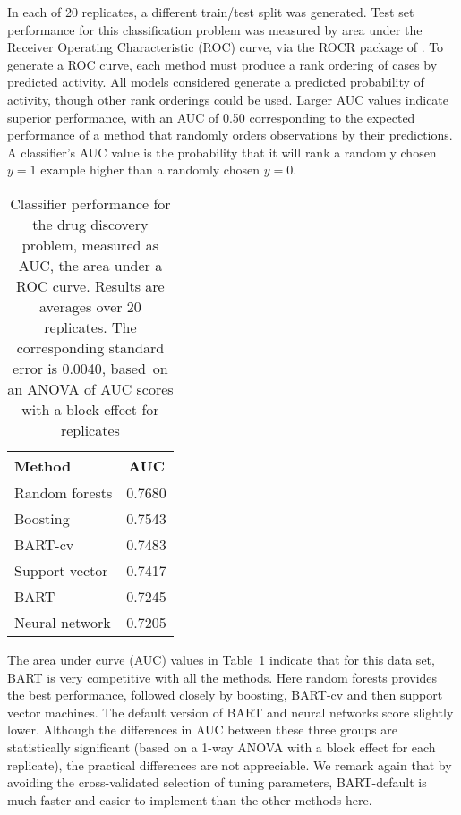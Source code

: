 \documentclass[aoas,nameyear,dvips]{arximspdf}
\newcommand{\citeasnoun}[1]{\citet{#1}}
\begin{document}
In each of 20 replicates, a different train/test split was generated.
Test set performance for this classification problem was measured by area under the
Receiver Operating Characteristic (ROC) curve, via the ROCR package of
\citeasnoun{ROCR}.  To generate a ROC curve, each method must produce a rank
ordering of cases by predicted activity.  All models considered generate a
predicted probability of activity, though other rank orderings could be
used.  Larger AUC values indicate superior performance, with an AUC of 0.50
corresponding to the expected performance of a method that randomly
orders observations by their predictions.  A classifier's AUC value
is the probability that it will rank a randomly chosen $y = 1$ example
higher than a randomly chosen $y= 0$. 
\begin{table}[b]
\caption{Classifier performance for the drug discovery problem, measured as
AUC, the area under a ROC curve.  Results are averages over 20 replicates.
The corresponding standard error is 0.0040, based~on an ANOVA of
AUC scores with a block effect for replicates}\label{tab:AUC}
\begin{tabular*}{6cm}{@{\extracolsep{\fill}}lc@{}}
\hline
\textbf{Method} & \textbf{AUC} \\
\hline
Random forests & 0.7680\\
Boosting       & 0.7543\\
BART-cv        & 0.7483\\
Support vector & 0.7417\\
BART           & 0.7245\\
Neural network & 0.7205\\
\hline
\end{tabular*}
\end{table}

The area under curve (AUC) values in Table~\ref{tab:AUC} indicate that for
this data set, BART is very competitive with all the methods.  Here
random forests provides the best performance, followed closely by
boosting, BART-cv and then support vector machines.  The default version of BART
and neural networks score slightly lower.  Although the differences in AUC between
these three groups are statistically significant (based on a 1-way ANOVA with a
block effect for each replicate), the practical differences are not appreciable.
We remark again that by avoiding the cross-validated selection of tuning
parameters, BART-default is much faster and easier to implement than the other methods here.
\end{document}
